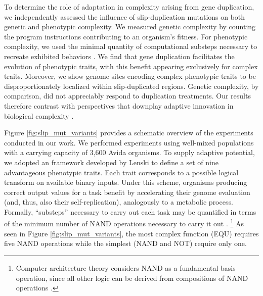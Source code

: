 To determine the role of adaptation in complexity arising from gene duplication, we independently assessed the influence of slip-duplication mutations on both genetic and phenotypic complexity.
We measured genetic complexity by counting the program instructions contributing to an organism's fitness.
For phenotypic complexity, we used the minimal quantity of computational substeps necessary to recreate exhibited behaviors \citet{Lenski2003Evolutionary}.
We find that gene duplication facilitates the evolution of phenotypic traits, with this benefit appearing exclusively for complex traits.
Moreover, we show genome sites encoding complex phenotypic traits to be disproportionately localized within slip-duplicated regions.
Genetic complexity, by comparison, did not appreciably respond to duplication treatments.
Our results therefore contrast with perspectives that downplay adaptive innovation in biological complexity \citep{Lynch2000,Beslon2021,Lynch2007}.

Figure \ref{fig:slip_mut_variants} provides a schematic overview of the experiments conducted in our work.
We performed experiments using well-mixed populations with a carrying capacity of 3,600 Avida organisms.
To supply adaptive potential, we adopted an framework developed by Lenski \citet{Lenski2003Evolutionary} to define a set of nine advantageous phenotypic traits.
Each trait corresponds to a possible logical transform on available binary inputs.
Under this scheme, organisms producing correct output values for a task benefit by accelerating their genome evaluation (and, thus, also their self-replication), analogously to a metabolic process.
Formally, ``substeps'' necessary to carry out each task may be quantified in terms of the minimum number of NAND operations necessary to carry it out \citep{Lenski2003Evolutionary}.%
\footnote{
Computer architecture theory considers NAND as a fundamental basis operation, since all other logic can be derived from compositions of NAND operations \citep{mano1997logic}.
}
As seen in Figure \ref{fig:slip_mut_variants}, the most complex function (EQU) requires five NAND operations while the simplest (NAND and NOT) require only one.

